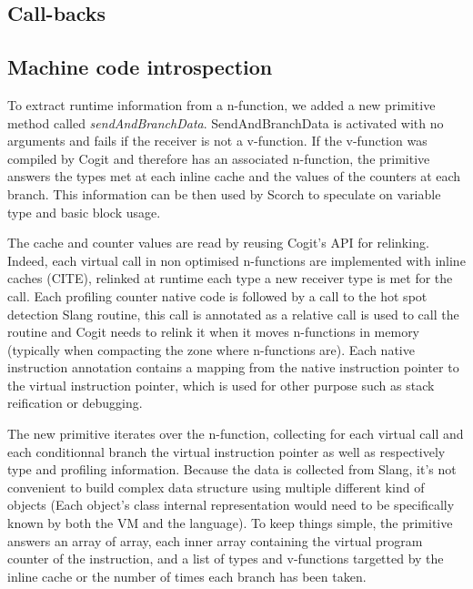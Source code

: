 \documentclass[a4paper,12pt,twoside]{../includes/ThesisStyle}
\begin{document}
\subsection{Call-backs}





\subsection{Machine code introspection}

To extract runtime information from a n-function, we added a new primitive method called \emph{sendAndBranchData}. SendAndBranchData is activated with no arguments and fails if the receiver is not a v-function. If the v-function was compiled by Cogit and therefore has an associated n-function, the primitive answers the types met at each inline cache and the values of the counters at each branch. This information can be then used by Scorch to speculate on variable type and basic block usage. 

The cache and counter values are read by reusing Cogit's API for relinking. Indeed, each virtual call in non optimised n-functions are implemented with inline caches (CITE), relinked at runtime each type a new receiver type is met for the call. Each profiling counter native code is followed by a call to the hot spot detection Slang routine, this call is annotated as a relative call is used to call the routine and Cogit needs to relink it when it moves n-functions in memory (typically when compacting the zone where n-functions are). Each native instruction annotation contains a mapping from the native instruction pointer to the virtual instruction pointer, which is used for other purpose such as stack reification or debugging.

The new primitive iterates over the n-function, collecting for each virtual call and each conditionnal branch the virtual instruction pointer as well as respectively type and profiling information. Because the data is collected from Slang, it's not convenient to build complex data structure using multiple different kind of objects (Each object's class internal representation would need to be specifically known by both the VM and the language). To keep things simple, the primitive answers an array of array, each inner array containing the virtual program counter of the instruction, and a list of types and v-functions targetted by the inline cache or the number of times each branch has been taken.
\end{document}

